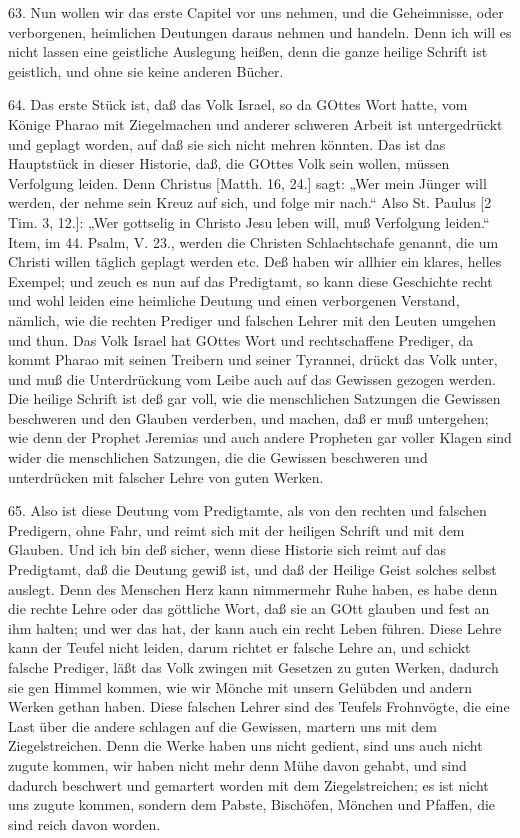 63. Nun wollen wir das erste Capitel vor uns nehmen, und die Geheimnisse, oder verborgenen, heimlichen Deutungen daraus nehmen und handeln. Denn ich will es nicht lassen eine geistliche Auslegung heißen, denn die ganze heilige Schrift ist geistlich, und ohne sie keine anderen Bücher.

64. Das erste Stück ist, daß das Volk Israel, so da GOttes Wort hatte, vom Könige Pharao mit Ziegelmachen und anderer schweren Arbeit ist untergedrückt und geplagt worden, auf daß sie sich nicht mehren könnten. Das ist das Hauptstück in dieser Historie, daß, die GOttes Volk sein wollen, müssen Verfolgung leiden. Denn Christus [Matth. 16, 24.] sagt: „Wer mein Jünger will werden, der nehme sein Kreuz auf sich, und folge mir nach.“ Also St. Paulus [2 Tim. 3, 12.]: „Wer gottselig in Christo Jesu leben will, muß Verfolgung leiden.“ Item, im 44. Psalm, V. 23., werden die Christen Schlachtschafe genannt, die um Christi willen täglich geplagt werden etc. Deß haben wir allhier ein klares, helles Exempel; und zeuch es nun auf das Predigtamt, so kann diese Geschichte recht und wohl leiden eine heimliche Deutung und einen verborgenen Verstand, nämlich, wie die rechten Prediger und falschen Lehrer mit den Leuten umgehen und thun. Das Volk Israel hat GOttes Wort und rechtschaffene Prediger, da kommt Pharao mit seinen Treibern und seiner Tyrannei, drückt das Volk unter, und muß die Unterdrückung vom Leibe auch auf das Gewissen gezogen werden. Die heilige Schrift ist deß gar voll, wie die menschlichen Satzungen die Gewissen beschweren und den Glauben verderben, und machen, daß er muß untergehen; wie denn der Prophet Jeremias und auch andere Propheten gar voller Klagen sind wider die menschlichen Satzungen, die die Gewissen beschweren und unterdrücken mit falscher Lehre von guten Werken.

65. Also ist diese Deutung vom Predigtamte, als von den rechten und falschen Predigern, ohne Fahr, und reimt sich mit der heiligen Schrift und mit dem Glauben. Und ich bin deß sicher, wenn diese Historie sich reimt auf das Predigtamt, daß die Deutung gewiß ist, und daß der Heilige Geist solches selbst auslegt. Denn des Menschen Herz kann nimmermehr Ruhe haben, es habe denn die rechte Lehre oder das göttliche Wort, daß sie an GOtt glauben und fest an ihm halten; und wer das hat, der kann auch ein recht Leben führen. Diese Lehre kann der Teufel nicht leiden, darum richtet er falsche Lehre an, und schickt falsche Prediger, läßt das Volk zwingen mit Gesetzen zu guten Werken, dadurch sie gen Himmel kommen, wie wir Mönche mit unsern Gelübden und andern Werken gethan haben. Diese falschen Lehrer sind des Teufels Frohnvögte, die eine Last über die andere schlagen auf die Gewissen, martern uns mit dem Ziegelstreichen. Denn die Werke haben uns nicht gedient, sind uns auch nicht zugute kommen, wir haben nicht mehr denn Mühe davon gehabt, und sind dadurch beschwert und gemartert worden mit dem Ziegelstreichen; es ist nicht uns zugute kommen, sondern dem Pabste, Bischöfen, Mönchen und Pfaffen, die sind reich davon worden.

